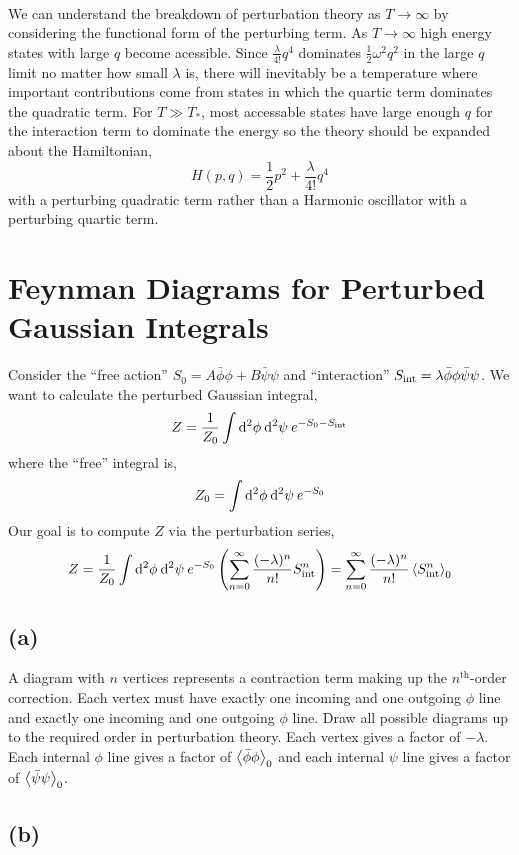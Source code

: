 \documentclass[12pt]{article}
\begin{document}
\bigskip\\
We can understand the breakdown of perturbation theory as $T \to \infty$ by considering the functional form of the perturbing term. As $T \to \infty$ high energy states with large $q$ become acessible. Since $\frac{\lambda}{4!} q^4$ dominates $\frac{1}{2} \omega^2 q^2$ in the large $q$ limit no matter how small $\lambda$ is, there will inevitably be a temperature where important contributions come from states in which the quartic term dominates the quadratic term. For $T\gg T_*$, most accessable states have large enough $q$ for the interaction term to dominate the energy so the theory should be expanded about the Hamiltonian,
\[ H(p,q) = \frac{1}{2} p^2 + \frac{\lambda}{4!} q^4 \]
with a perturbing quadratic term rather than a Harmonic oscillator with a perturbing quartic term. 
\section{Feynman Diagrams for Perturbed Gaussian Integrals}

Consider the ``free action'' $S_0 = A \bar{\phi} \phi + B \bar{\psi} \psi$ and ``interaction'' $S_{\mathrm{int}} = \lambda \bar{\phi} \phi \bar{\psi} \psi$. We want to calculate the perturbed Gaussian integral,
\[ Z = \frac{1}{Z_0} \int \mathrm{d}^{2} \phi \: \mathrm{d}^{2} \psi \: e^{-S_0 - S_{\mathrm{int}}} \]
where the ``free'' integral is,
\[ Z_0 = \int \mathrm{d}^{2} \phi \: \mathrm{d}^{2} \psi \: e^{-S_0} \]
Our goal is to compute $Z$ via the perturbation series,
\[ Z = \frac{1}{Z_0} \int \mathrm{d}^{2} \phi \: \mathrm{d}^{2} \psi \: e^{-S_0} \left( \sum_{n = 0}^\infty \frac{(-\lambda)^n}{n!} S_{\mathrm{int}}^n \right) = \sum_{n = 0}^\infty  \frac{(-\lambda)^n}{n!} \left< S_{\mathrm{int}}^n \right>_0 \]
 
\subsection{(a)}

A diagram with $n$ vertices represents a contraction term making up the $n^{\mathrm{th}}$-order correction. Each vertex must have exactly one incoming and one outgoing $\phi$ line and exactly one incoming and one outgoing $\phi$ line. Draw all possible diagrams up to the required order in perturbation theory. Each vertex gives a factor of $-\lambda$. Each internal $\phi$ line gives a factor of $\left< \bar{\phi} \phi \right>_0$ and each internal $\psi$ line gives a factor of $\left< \bar{\psi} \psi \right>_0$. 

\subsection{(b)}
\end{document}
